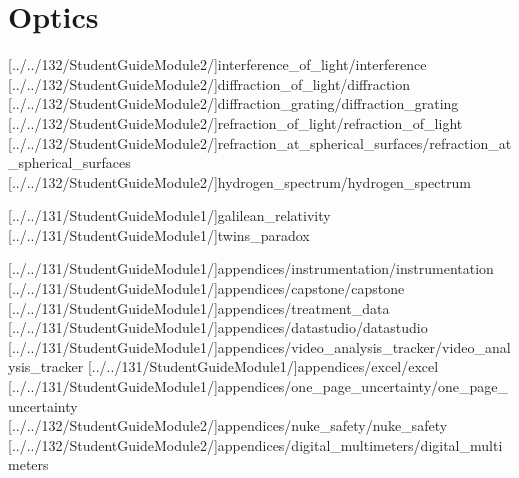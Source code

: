 \documentclass[english,twoside]{article}
\begin{document}
\part{Optics}

[../../132/StudentGuideModule2/]{interference_of_light/interference}
[../../132/StudentGuideModule2/]{diffraction_of_light/diffraction}
[../../132/StudentGuideModule2/]{diffraction_grating/diffraction_grating}
[../../132/StudentGuideModule2/]{refraction_of_light/refraction_of_light}
[../../132/StudentGuideModule2/]{refraction_at_spherical_surfaces/refraction_at_spherical_surfaces}
[../../132/StudentGuideModule2/]{hydrogen_spectrum/hydrogen_spectrum}


[../../131/StudentGuideModule1/]{galilean_relativity}
[../../131/StudentGuideModule1/]{twins_paradox}

\startappendix

[../../131/StudentGuideModule1/]{appendices/instrumentation/instrumentation}
[../../131/StudentGuideModule1/]{appendices/capstone/capstone}
[../../131/StudentGuideModule1/]{appendices/treatment_data}
[../../131/StudentGuideModule1/]{appendices/datastudio/datastudio}
[../../131/StudentGuideModule1/]{appendices/video_analysis_tracker/video_analysis_tracker}
[../../131/StudentGuideModule1/]{appendices/excel/excel}
[../../131/StudentGuideModule1/]{appendices/one_page_uncertainty/one_page_uncertainty}
[../../132/StudentGuideModule2/]{appendices/nuke_safety/nuke_safety}
[../../132/StudentGuideModule2/]{appendices/digital_multimeters/digital_multimeters}
\end{document}
